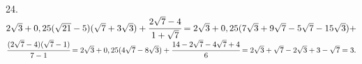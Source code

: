 24. $2\sqrt{3}+0,25(\sqrt{21}-5)(\sqrt{7}+3\sqrt{3})+\cfrac{2\sqrt{7}-4}{1+\sqrt{7}}=
2\sqrt{3}+0,25(7\sqrt{3}+9\sqrt{7}-5\sqrt{7}-15\sqrt{3})+$\\$\cfrac{(2\sqrt{7}-4)(\sqrt{7}-1)}{7-1}=
2\sqrt{3}+0,25(4\sqrt{7}-8\sqrt{3})+\cfrac{14-2\sqrt{7}-4\sqrt{7}+4}{6}=
2\sqrt{3}+\sqrt{7}-2\sqrt{3}+3-\sqrt{7}=3.$\\
